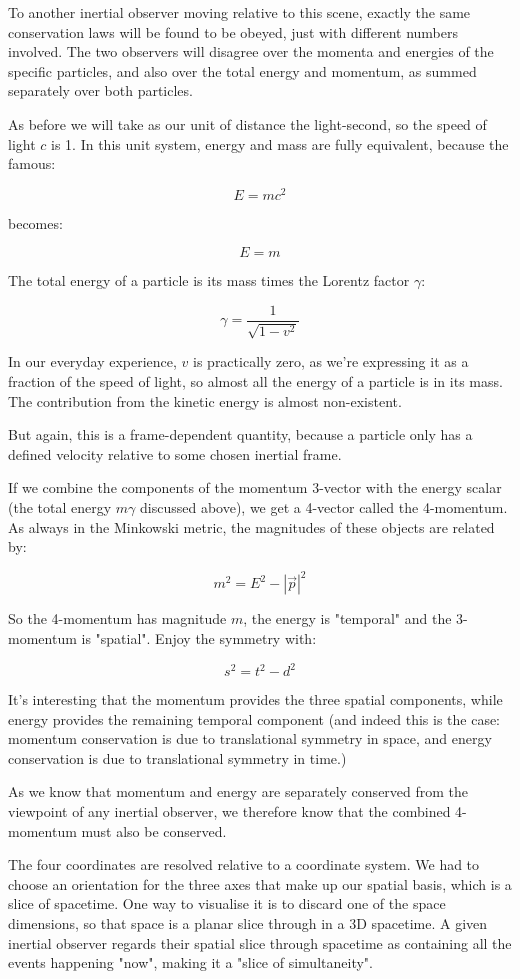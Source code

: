 To another inertial observer moving relative to this scene, exactly the same conservation laws will be found to be obeyed, just with different numbers involved. The two observers will disagree over the momenta and energies of the specific particles, and also over the total energy and momentum, as summed separately over both particles.

As before we will take as our unit of distance the light-second, so the speed of light $c$ is 1. In this unit system, energy and mass are fully equivalent, because the famous:

$$E = mc^2$$

becomes:

$$E = m$$

The total energy of a particle is its mass times the Lorentz factor $\gamma$:

$$\gamma = \frac{1}{\sqrt{1-v^2}} $$

In our everyday experience, $v$ is practically zero, as we're expressing it as a fraction of the speed of light, so almost all the energy of a particle is in its mass. The contribution from the kinetic energy is almost non-existent.

But again, this is a frame-dependent quantity, because a particle only has a defined velocity relative to some chosen inertial frame.

If we combine the components of the momentum 3-vector with the energy scalar (the total energy $m\gamma$ discussed above), we get a 4-vector called the 4-momentum. As always in the Minkowski metric, the magnitudes of these objects are related by:

$$m^2 = E^2 - |\vec{p}|^2$$

So the 4-momentum has magnitude $m$, the energy is "temporal" and the 3-momentum is "spatial". Enjoy the symmetry with:

$$s^2 = t^2 - d^2$$

It's interesting that the momentum provides the three spatial components, while energy provides the remaining temporal component (and indeed this is the case: momentum conservation is due to translational symmetry in space, and energy conservation is due to translational symmetry in time.)

As we know that momentum and energy are separately conserved from the viewpoint of any inertial observer, we therefore know that the combined 4-momentum must also be conserved.

The four coordinates are resolved relative to a coordinate system. We had to choose an orientation for the three axes that make up our spatial basis, which is a slice of spacetime. One way to visualise it is to discard one of the space dimensions, so that space is a planar slice through in a 3D spacetime. A given inertial observer regards their spatial slice through spacetime as containing all the events happening "now", making it a "slice of simultaneity".

